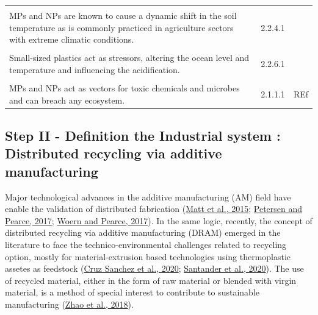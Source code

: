 \documentclass[]{elsarticle} %
\begin{document}
\begin{table}[!h]
\begin{tabular}[t]{>{\raggedright\arraybackslash}p{30em}ll}
\cellcolor{gray!6}{Plastics-induced variations in solar radiation in the water column can alter physical processes at the ocean’s surface and near-surface layers as well as trigger climate feedback mechanisms} & \cellcolor{gray!6}{2.2.6.1} & \cellcolor{gray!6}{{}[@Kumar2021]}\\
MPs and NPs are known to cause a dynamic shift in the soil temperature as is commonly practiced in agriculture sectors with extreme climatic conditions. & 2.2.4.1 & \\
\addlinespace
\cellcolor{gray!6}{MPs and NPs in the soil ecosystem are known to have a strong impact on the population structure and survival of these faunas [135,137,154,158].} & \cellcolor{gray!6}{2.2.4.1} & \cellcolor{gray!6}{}\\
Small-sized plastics act as stressors, altering the ocean level and temperature and influencing the acidification. & 2.2.6.1 & \\
\cellcolor{gray!6}{High amounts of MPs and NPs are more substantially found in pelagic species than in deep-water species.} & \cellcolor{gray!6}{1.1.5.1} & \cellcolor{gray!6}{}\\
MPs and NPs act as vectors for toxic chemicals and microbes and can breach any ecosystem. & 2.1.1.1 & REf\\
\bottomrule
\end{tabular}
\end{table}

\hypertarget{step-ii---definition-the-industrial-system-distributed-recycling-via-additive-manufacturing}{%
\subsection{Step II - Definition the Industrial system : Distributed recycling via additive manufacturing}\label{step-ii---definition-the-industrial-system-distributed-recycling-via-additive-manufacturing}}

Major technological advances in the additive manufacturing (AM) field have enable the validation of distributed fabrication (\protect\hyperlink{ref-Matt2015}{Matt et al., 2015}; \protect\hyperlink{ref-Petersen2017a}{Petersen and Pearce, 2017}; \protect\hyperlink{ref-Woern2017}{Woern and Pearce, 2017}).
In the same logic, recently, the concept of distributed recycling via additive manufacturing (DRAM) emerged in the literature to face the technico-environmental challenges related to recycling option, mostly for material-extrusion based technologies using thermoplastic assetes as feedstock (\protect\hyperlink{ref-CruzSanchez2020}{Cruz Sanchez et al., 2020}; \protect\hyperlink{ref-Santander2020}{Santander et al., 2020}).
The use of recycled material, either in the form of raw material or blended with virgin material, is a method of special interest to contribute to sustainable manufacturing (\protect\hyperlink{ref-Zhao2018}{Zhao et al., 2018}).
\end{document}
